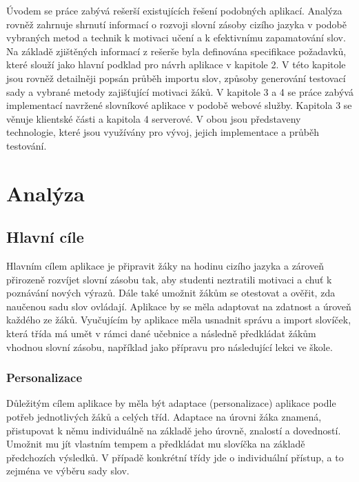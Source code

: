 \documentclass[a4paper,11pt,titlepage,fleqn]{article}
\begin{document}
    Úvodem se práce zabývá rešerší existujících řešení podobných aplikací. Analýza rovněž zahrnuje shrnutí informací o rozvoji slovní zásoby cizího jazyka v podobě vybraných metod a technik k motivaci učení a k efektivnímu zapamatování slov. Na základě zjištěných informací z rešerše byla definována specifikace požadavků, které slouží jako hlavní podklad pro návrh aplikace v kapitole 2. V této kapitole jsou rovněž detailněji popsán průběh importu slov, způsoby generování testovací sady a vybrané metody zajišťující motivaci žáků. V kapitole 3 a 4 se práce zabývá implementací navržené slovníkové aplikace v podobě webové služby. Kapitola 3 se věnuje klientské části a kapitola 4 serverové. V obou jsou představeny technologie, které jsou využívány pro vývoj, jejich implementace a průběh testování. 



\newpage
\section{Analýza}
    
    \subsection{Hlavní cíle}
        
        Hlavním cílem aplikace je připravit žáky na hodinu cizího jazyka a zároveň přirozeně rozvíjet slovní zásobu tak, aby studenti neztratili motivaci a chuť k poznávání nových výrazů. Dále také umožnit žákům se otestovat a ověřit, zda naučenou sadu slov ovládají. Aplikace by se měla adaptovat na zdatnost a úroveň každého ze žáků. Vyučujícím by aplikace měla usnadnit správu a import slovíček, která třída má umět v rámci dané učebnice a následně předkládat žákům vhodnou slovní zásobu, například jako přípravu pro následující lekci ve škole.

        \subsubsection{Personalizace}
            Důležitým cílem aplikace by měla být adaptace (personalizace) aplikace podle potřeb jednotlivých žáků a celých tříd. Adaptace na úrovni žáka znamená, přistupovat k němu individuálně na základě jeho úrovně, znalostí a dovedností. Umožnit mu jít vlastním tempem a předkládat mu slovíčka na základě předchozích výsledků. V případě konkrétní třídy jde o individuální přístup, a to zejména ve výběru sady slov. 
\end{document}
